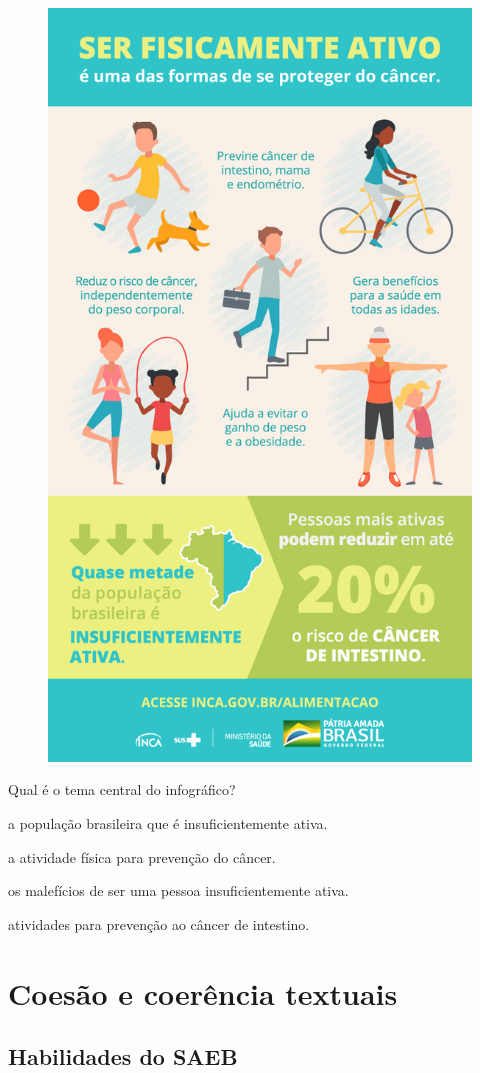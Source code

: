 \begin{conteudo}
\begin{conteudo}
\begin{conteudo}
\begin{conteudo}
\begin{conteudo}
\begin{figure}[htpb!]
\centering
\includegraphics[width=.5\textwidth]{media/image34.jpeg}
\end{figure}


Qual é o tema central do infográfico?

\begin{escolha}
\item a população brasileira que é insuficientemente ativa.

\item a atividade física para prevenção do câncer.

\item os malefícios de ser uma pessoa insuficientemente ativa.

\item atividades para prevenção ao câncer de intestino.
\end{escolha}
\pagebreak

\chapter{Coesão e coerência textuais}

\section*{Habilidades do SAEB}


\end{conteudo}
\end{conteudo}
\end{conteudo}
\end{conteudo}
\end{conteudo}
